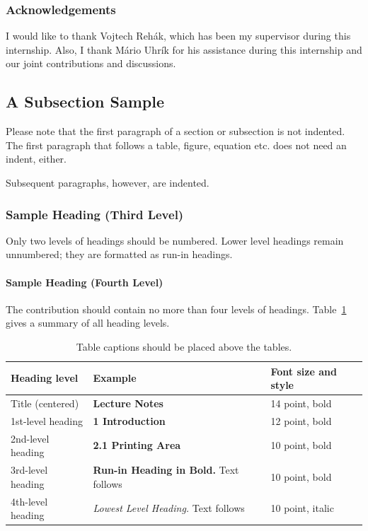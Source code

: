 \documentclass[runningheads,custombib]{llncs}
\begin{document}
\subsubsection*{Acknowledgements}
I would like to thank Vojtech Reh{\'{a}}k, which has been  my supervisor during this internship. Also, I thank M\'{a}rio Uhr\'{i}k for his assistance during this internship and our joint contributions and discussions. 

\iffalse
\subsection{A Subsection Sample}
Please note that the first paragraph of a section or subsection is
not indented. The first paragraph that follows a table, figure,
equation etc. does not need an indent, either.

Subsequent paragraphs, however, are indented.

\subsubsection{Sample Heading (Third Level)} Only two levels of
headings should be numbered. Lower level headings remain unnumbered;
they are formatted as run-in headings.

\paragraph{Sample Heading (Fourth Level)}
The contribution should contain no more than four levels of
headings. Table~\ref{tab1} gives a summary of all heading levels.

\begin{table}
\caption{Table captions should be placed above the
tables.}\label{tab1}
\begin{tabular}{|l|l|l|}
\hline
Heading level &  Example & Font size and style\\
\hline
Title (centered) &  {\Large\bfseries Lecture Notes} & 14 point, bold\\
1st-level heading &  {\large\bfseries 1 Introduction} & 12 point, bold\\
2nd-level heading & {\bfseries 2.1 Printing Area} & 10 point, bold\\
3rd-level heading & {\bfseries Run-in Heading in Bold.} Text follows & 10 point, bold\\
4th-level heading & {\itshape Lowest Level Heading.} Text follows & 10 point, italic\\
\hline
\end{tabular}
\end{table}
\end{document}
